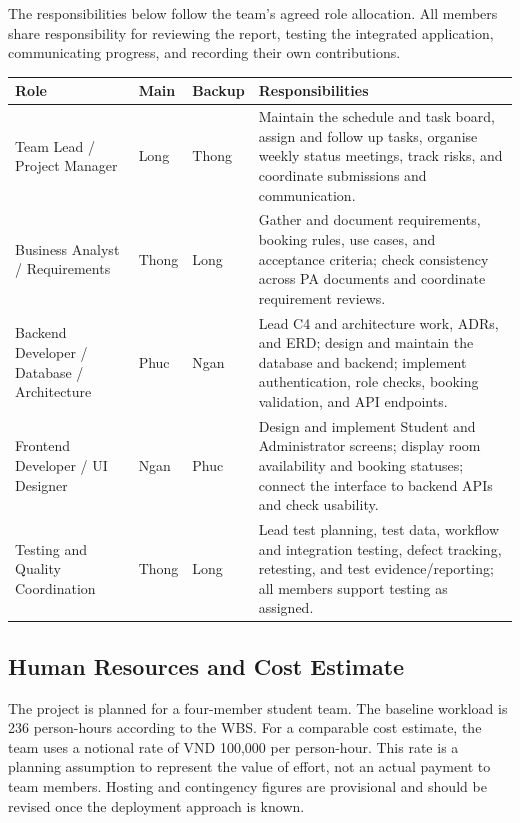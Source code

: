 The responsibilities below follow the team's agreed role allocation. All members
share responsibility for reviewing the report, testing the integrated application,
communicating progress, and recording their own contributions.

\begingroup
\small
\setlength{\tabcolsep}{5pt}
\renewcommand{\arraystretch}{1.22}
\begin{center}
\begin{tabular}{@{}>{\raggedright\arraybackslash}p{3.0cm}
>{\centering\arraybackslash}p{1.65cm}
>{\centering\arraybackslash}p{1.65cm}
>{\raggedright\arraybackslash}p{6.0cm}@{}}
\hline
\textbf{Role} & \textbf{Main} & \textbf{Backup} & \textbf{Responsibilities} \\
\hline
Team Lead / Project Manager & Long & Thong &
Maintain the schedule and task board, assign and follow up tasks, organise weekly
status meetings, track risks, and coordinate submissions and communication. \\
\hline
Business Analyst / Requirements & Thong & Long &
Gather and document requirements, booking rules, use cases, and acceptance criteria;
check consistency across PA documents and coordinate requirement reviews. \\
\hline
Backend Developer / Database / Architecture & Phuc & Ngan &
Lead C4 and architecture work, ADRs, and ERD; design and maintain the database and
backend; implement authentication, role checks, booking validation, and API endpoints. \\
\hline
Frontend Developer / UI Designer & Ngan & Phuc &
Design and implement Student and Administrator screens; display room availability and
booking statuses; connect the interface to backend APIs and check usability. \\
\hline
Testing and Quality Coordination & Thong & Long &
Lead test planning, test data, workflow and integration testing, defect tracking,
retesting, and test evidence/reporting; all members support testing as assigned. \\
\hline
\end{tabular}
\end{center}
\endgroup

\subsection{Human Resources and Cost Estimate}

The project is planned for a four-member student team. The baseline workload is
236 person-hours according to the WBS. For a comparable cost estimate, the team uses a notional rate of
VND 100,000 per person-hour. This rate is a planning assumption to represent the
value of effort, not an actual payment to team members. Hosting and contingency
figures are provisional and should be revised once the deployment approach is known.

